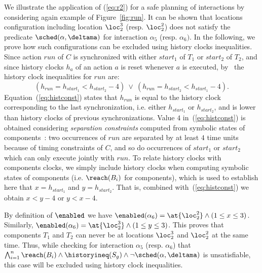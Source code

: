 \begin{example}
  We illustrate the application of (\ref{eq:r2}) for a safe planning of interactions by considering again example of Figure~\ref{fig:run}.
  It can be shown that locations configuration including location $\loc_2^3$ (resp. $\loc_2^2$) does not satisfy the predicate $\sched(\alpha,\deltama)$ for interaction $\alpha_5$ (resp. $\alpha_6)$.
  In the following, we prove how such configurations can be excluded using history clocks inequalities.\\
  Since action $run$ of $C$ is synchronized with either $start_1$ of $T_1$ or $start_2$ of $T_2$, and since history clocks $h_a$ of an action $a$ is reset whenever $a$ is executed, 
  by~\cite{DBLP:conf/tacas/AstefanoaeiRBBC14} the history clock inequalities for $run$ are:
  \begin{equation}\label{eq:histconst}
    ( h_{run} = h_{start_1} < h_{start_2} - 4 ) \ \vee \ ( h_{run} = h_{start_2} < h_{start_1} - 4 ).
  \end{equation}
  Equation~(\ref{eq:histconst}) states that $h_{run}$ is equal to the history clock corresponding to the last synchronization, i.e. either $h_{start_1}$ or $h_{start_2}$, and is lower than history clocks of previous synchronizations.
  Value $4$ in~(\ref{eq:histconst}) is obtained considering \emph{separation constraints} computed from symbolic states of components~\cite{DBLP:conf/tacas/AstefanoaeiRBBC14}: two occurrences of $run$ are separated by at least $4$ time units because of timing constraints of $C$, and so do occurrences of $start_1$ or $start_2$ which can only execute jointly with $run$.
  To relate history clocks with components clocks, we simply include history clocks when computing symbolic states of components (i.e. $\reach(B_i)$ for components), which is used to establish here that $x = h_{start_1}$ and $y = h_{start_2}$.
  That is, combined with~(\ref{eq:histconst}) we obtain $x < y - 4$ or $y < x - 4$.
  
  By definition of $\enabled$ we have $\enabled(\alpha_6) = \at{\loc_2^2} \wedge  (1 \leq x \leq 3)  $.
  Similarly, $\enabled(\alpha_6) = \at{\loc_2^3} \wedge (1\le y \leq 3)$.
  This proves that components $T_1$ and $T_2$ can never be at locations $\loc_2^3$ and $\loc_2^2$ at the same time. Thus, while checking for interaction $\alpha_5$ (resp. $\alpha_6$)
  that $\bigwedge_{i=1}^n \reach(B_i)\wedge\historyineq(S_g)\wedge\neg\sched(\alpha,\deltama)$ is unsatisfiable, this case will be excluded using history clock inequalities. 
\end{example}


